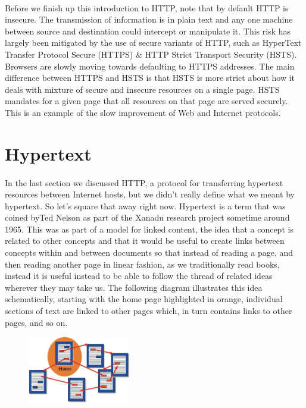\paragraph{} Before we finish up this introduction to HTTP, note that by default HTTP is insecure. The transmission of information is in plain text and any one machine between source and destination could intercept or manipulate it. This risk has largely been mitigated by the use of secure variants of HTTP, such as HyperText Transfer Protocol Secure (HTTPS) \& HTTP Strict Transport Security (HSTS). Browsers are slowly moving towards defaulting to HTTPS addresses. The main difference between HTTPS and HSTS is that HSTS is more strict about how it deals with mixture of secure and insecure resources on a single page. HSTS mandates for a given page that all resources on that page are served securely. This is an example of the slow improvement of Web and Internet protocols.


\section{Hypertext}
\paragraph{} In the last section we discussed HTTP, a protocol for transferring hypertext resources between Internet hosts, but we didn't really define what we meant by hypertext. So let's square that away right now. Hypertext is a term that was coined byTed Nelson as part of the Xanadu research project sometime around 1965. This was as part of a model for linked content, the idea that a concept is related to other concepts and that it would be useful to create links between concepts within and between documents so that instead of reading a page, and then reading another page in linear fashion, as we traditionally read books, instead it is useful instead to be able to follow the thread of related ideas wherever they may take us. The following diagram illustrates this idea schematically, starting with the home page highlighted in orange, individual sections of text are linked to other pages which, in turn contains links to other pages, and so on.

\begin{figure}[H]
\centering
\includegraphics[width=0.4\textwidth]{figures/hypertext.png}
\label{fig:hypertext}
\end{figure}


